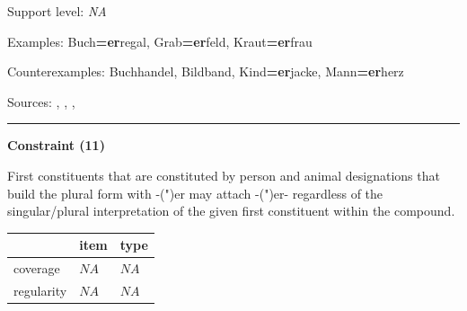\vspace{-1.35em}

\noindent
Support level: \textit{NA}

\vspace{0.3em}

\noindent
Examples: Buch\textbf{=er}regal, Grab\textbf{=er}feld, Kraut\textbf{=er}frau

\noindent
Counterexamples: Buch{\zeroLinker}handel, Bild{\zeroLinker}band, Kind\textbf{=er}jacke, Mann\textbf{=er}herz

\vspace{0.3em}

\noindent
Sources: \citet[229]{eisenberg_2013}, \citet[80, 81]{nuebling_szczepaniak_2013}, \citet[99]{ortner_mueller-bollhagen_1991}, \citet[29]{schaefer_pankratz_2018}

\vspace{0.35em}
\hrule




\vspace{0.4em}

\begin{center}
\textbf{Constraint (11)}
\end{center}

\noindent
First constituents that are constituted by person and animal designations that build the plural form with -(")er may attach -(")er- regardless of the singular/plural interpretation of the given first constituent within the compound.
\vspace{0.5em}


\vspace{-0.25em}

\begin{table}[!ht]
\begin{center}
\setlength{\extrarowheight}{1pt}
\begin{tabularx}{\columnwidth}{|X|X|X|}
\hline
 & item & type \\
\hline
 coverage & $NA$ & $NA$ \\
\hline
 regularity & $NA$ & $NA$ \\
\hline
\end{tabularx}
\end{center}
\end{table}

